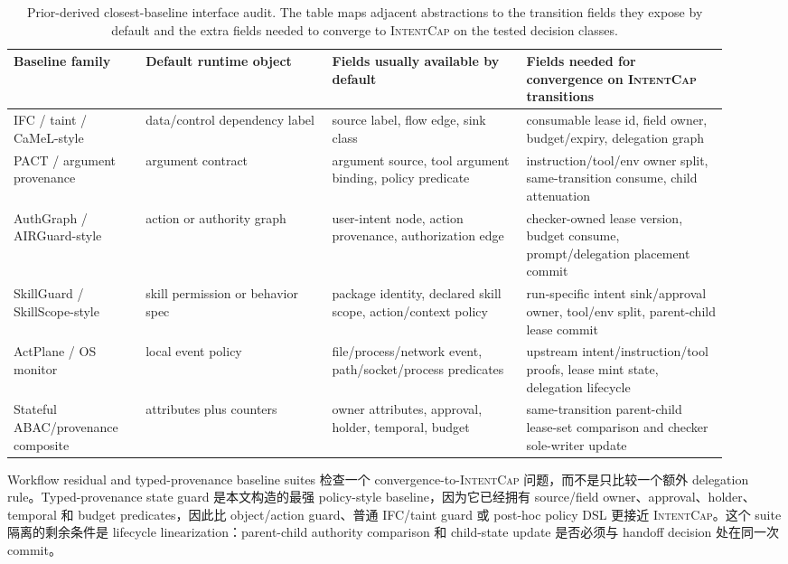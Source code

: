\documentclass[UTF8,a4paper,11pt]{ctexart}
\newcommand{\sys}{\textsc{IntentCap}\xspace}
\begin{document}
\begin{table}[t]
\centering
\scriptsize
\setlength{\tabcolsep}{2pt}
\caption{Prior-derived closest-baseline interface audit. The table maps adjacent abstractions to the transition fields they expose by default and the extra fields needed to converge to \sys on the tested decision classes.}
\label{tab:prior-derived-interface-audit}
\begin{tabular}{p{0.17\linewidth}p{0.24\linewidth}p{0.25\linewidth}p{0.26\linewidth}}
\toprule
Baseline family & Default runtime object & Fields usually available by default & Fields needed for convergence on \sys transitions \\
\midrule
IFC / taint / CaMeL-style & data/control dependency label & source label, flow edge, sink class & consumable lease id, field owner, budget/expiry, delegation graph \\
PACT / argument provenance & argument contract & argument source, tool argument binding, policy predicate & instruction/tool/env owner split, same-transition consume, child attenuation \\
AuthGraph / AIRGuard-style & action or authority graph & user-intent node, action provenance, authorization edge & checker-owned lease version, budget consume, prompt/delegation placement commit \\
SkillGuard / SkillScope-style & skill permission or behavior spec & package identity, declared skill scope, action/context policy & run-specific intent sink/approval owner, tool/env split, parent-child lease commit \\
ActPlane / OS monitor & local event policy & file/process/network event, path/socket/process predicates & upstream intent/instruction/tool proofs, lease mint state, delegation lifecycle \\
Stateful ABAC/provenance composite & attributes plus counters & owner attributes, approval, holder, temporal, budget & same-transition parent-child lease-set comparison and checker sole-writer update \\
\bottomrule
\end{tabular}
\end{table}

Workflow residual and typed-provenance baseline suites 检查一个 convergence-to-\sys 问题，而不是只比较一个额外 delegation rule。Typed-provenance state guard 是本文构造的最强 policy-style baseline，因为它已经拥有 source/field owner、approval、holder、temporal 和 budget predicates，因此比 object/action guard、普通 IFC/taint guard 或 post-hoc policy DSL 更接近 \sys。这个 suite 隔离的剩余条件是 lifecycle linearization：parent-child authority comparison 和 child-state update 是否必须与 handoff decision 处在同一次 commit。
\end{document}
